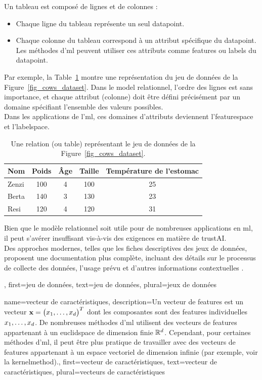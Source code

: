{{		Un tableau est composé de lignes et de colonnes :
		\begin{itemize}
			\item Chaque ligne du tableau représente un seul \gls{datapoint}.
			\item Chaque colonne du tableau correspond à un attribut spécifique du \gls{datapoint}. 
			Les méthodes d'\gls{ml} peuvent utiliser ces attributs comme \glspl{feature} ou \glspl{label}
			du \gls{datapoint}.
		\end{itemize}
		Par exemple, la Table~\ref{tab:cowdata} montre une représentation du jeu de données de la Figure~\ref{fig_cows_dataset}.
		Dans le \gls{model} relationnel, l’ordre des lignes est sans importance, et chaque attribut 
		(colonne) doit être défini précisément par un domaine spécifiant l’ensemble des valeurs possibles.\\
		Dans les applications de l'\gls{ml}, ces domaines d’attributs deviennent l’\gls{featurespace} 
		et l'\gls{labelspace}.
		\begin{table}[H]
			\centering
			\begin{tabular}{lcccc}
				\hline
				\textbf{Nom} & \textbf{Poids} & \textbf{Âge} & \textbf{Taille} & \textbf{Température de l'estomac} \\
				\hline
				Zenzi & 100 & 4 & 100 & 25 \\
				Berta & 140 & 3 & 130 & 23 \\
				Resi  & 120 & 4 & 120 & 31 \\
				\hline
			\end{tabular}
			\caption{Une relation (ou table) représentant le jeu de données de la Figure~\ref{fig_cows_dataset}.}
			\label{tab:cowdata}
		\end{table}
		Bien que le modèle relationnel soit utile pour de nombreuses applications en \gls{ml}, 
		il peut s’avérer insuffisant vis-à-vis des exigences en matière de \gls{trustAI}.\\
		Des approches modernes, telles que les fiches descriptives des jeux de données, proposent une documentation 
		plus complète, incluant des détails sur le processus de collecte des données, l’usage prévu 
		et d’autres informations contextuelles \cite{DatasheetData2021}.
	},
	first={jeu de données},
	text={jeu de données},
	plural={jeux de données}
}

{name={vecteur de caractéristiques},
	description={Un  vecteur de \glspl{feature} est un vecteur 
		${\bf x} = \big(x_{1},\ldots,x_{d}\big)^{T}$ dont les composantes sont des \glspl{feature} individuelles 
		$x_{1},\ldots,x_{d}$. De nombreuses méthodes d'\gls{ml} utilisent des vecteurs de \glspl{feature} 
		appartenant à un \gls{euclidspace} de dimension finie $\mathbb{R}^{d}$. 
		Cependant, pour certaines méthodes d'\gls{ml}, il peut être plus pratique de travailler avec des 
		vecteurs de \glspl{feature} appartenant à un espace vectoriel de dimension infinie 
		(par exemple, voir la \gls{kernelmethod}).},
	first={vecteur de caractéristiques},
	text={vecteur de caractéristiques},
	plural={vecteurs de caractéristiques}
}

